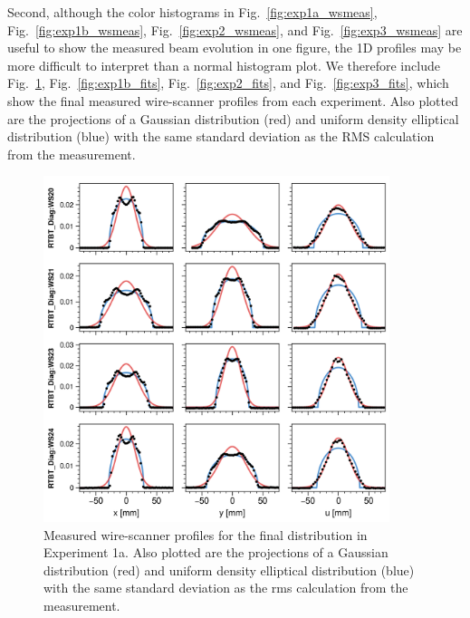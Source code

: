 Second, although the color histograms in Fig.~\ref{fig:exp1a_wsmeas}, Fig.~\ref{fig:exp1b_wsmeas}, Fig.~\ref{fig:exp2_wsmeas}, and Fig.~\ref{fig:exp3_wsmeas} are useful to show the measured beam evolution in one figure, the 1D profiles may be more difficult to interpret than a normal histogram plot. We therefore include Fig.~\ref{fig:exp1a_fits}, Fig.~\ref{fig:exp1b_fits}, Fig.~\ref{fig:exp2_fits}, and Fig.~\ref{fig:exp3_fits}, which show the final measured wire-scanner profiles from each experiment. Also plotted are the projections of a Gaussian distribution (red) and uniform density elliptical distribution (blue) with the same standard deviation as the RMS calculation from the measurement. 
%
\begin{figure}[!p]
    \centering
    \includegraphics[width=0.9\textwidth]{Images/chapter5/exp1a/fits_9.png}
    \caption{Measured wire-scanner profiles for the final distribution in Experiment 1a. Also plotted are the projections of a Gaussian distribution (red) and uniform density elliptical distribution (blue) with the same standard deviation as the rms calculation from the measurement.}
    \label{fig:exp1a_fits}
\end{figure}
%
